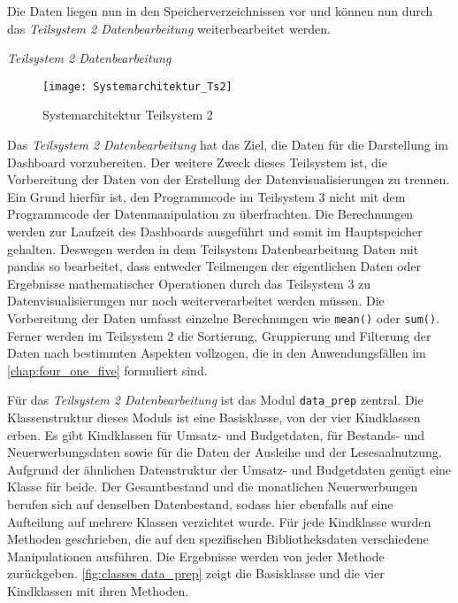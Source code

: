     Die Daten liegen nun in den Speicherverzeichnissen vor und können nun durch das \textit{Teilsystem 2 Datenbearbeitung} 
    weiterbearbeitet werden.
    
    \noindent
    \textit{Teilsystem 2 Datenbearbeitung}

    \begin{figure}[H]
        \centering
            \texttt{[image: Systemarchitektur\_Ts2]}
            \caption{Systemarchitektur Teilsystem 2}
            \label{fig:Systemarchitektur Teilsystem 2}
    \end{figure}

    Das \textit{Teilsystem 2 Datenbearbeitung} hat das Ziel, die Daten für die Darstellung im Dashboard vorzubereiten. Der weitere Zweck dieses
    Teilsystem ist, die Vorbereitung der Daten von der Erstellung der Datenvisualisierungen zu trennen. Ein Grund hierfür
    ist, den Programmcode im Teilsystem 3 nicht mit dem Programmcode der Datenmanipulation zu überfrachten. Die  Berechnungen
    werden zur Laufzeit des Dashboards ausgeführt und somit im Hauptspeicher gehalten.
    Deswegen werden in dem Teilsystem Datenbearbeitung Daten mit pandas so bearbeitet, 
    dass entweder Teilmengen der eigentlichen Daten oder Ergebnisse mathematischer Operationen durch das Teilsystem 3 
    zu Datenvisualisierungen nur noch weiterverarbeitet werden müssen. Die Vorbereitung der Daten umfasst einzelne Berechnungen 
    wie \texttt{mean()} oder \texttt{sum()}. Ferner werden im Teilsystem 2 die Sortierung, Gruppierung und Filterung der 
    Daten nach bestimmten Aspekten vollzogen, die in den Anwendungsfällen im \autoref{chap:four_one_five} formuliert sind.
    
    Für das \textit{Teilsystem 2 Datenbearbeitung} ist das Modul \texttt{data\_prep} zentral. Die Klassenstruktur dieses Moduls ist eine 
    Basisklasse, von der vier Kindklassen erben. Es gibt Kindklassen für Umsatz- und Budgetdaten, für Bestands- und Neuerwerbungsdaten sowie für die Daten der Ausleihe und 
    der Lesesaalnutzung. Aufgrund der ähnlichen Datenstruktur der Umsatz- und Budgetdaten genügt eine Klasse für beide.
    Der Gesamtbestand und die monatlichen Neuerwerbungen berufen sich auf denselben Datenbestand, sodass hier ebenfalls auf eine Aufteilung auf mehrere Klassen verzichtet wurde.
    Für jede Kindklasse wurden Methoden geschrieben, die auf den spezifischen Bibliotheksdaten verschiedene Manipulationen ausführen.
    Die Ergebnisse werden von jeder Methode zurückgeben. \autoref{fig:classes data_prep} zeigt die Basisklasse und die vier Kindklassen mit ihren Methoden.


